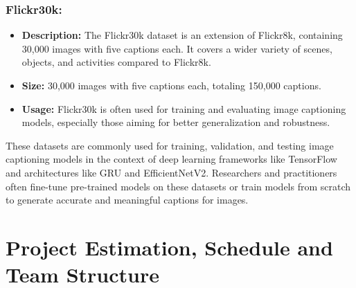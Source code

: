 \documentclass[oneside,a4paper,12pt]{report}
\begin{document}
\subsection{Flickr30k: }
\begin{itemize}


\item{\textbf{Description:}} The Flickr30k dataset is an extension of Flickr8k, containing 30,000 images with five captions each. It covers a wider variety of scenes, objects, and activities compared to Flickr8k.
\item{\textbf{Size:} }30,000 images with five captions each, totaling 150,000 captions.
\item{\textbf{Usage:} }Flickr30k is often used for training and evaluating image captioning models, especially those aiming for better generalization and robustness.
\end{itemize}
These datasets are commonly used for training, validation, and testing image captioning models in the context of deep learning frameworks like TensorFlow and architectures like GRU and EfficientNetV2. Researchers and practitioners often fine-tune pre-trained models on these datasets or train models from scratch to generate accurate and meaningful captions for images.
\chapter{Project Estimation, Schedule and Team Structure}
\end{document}
